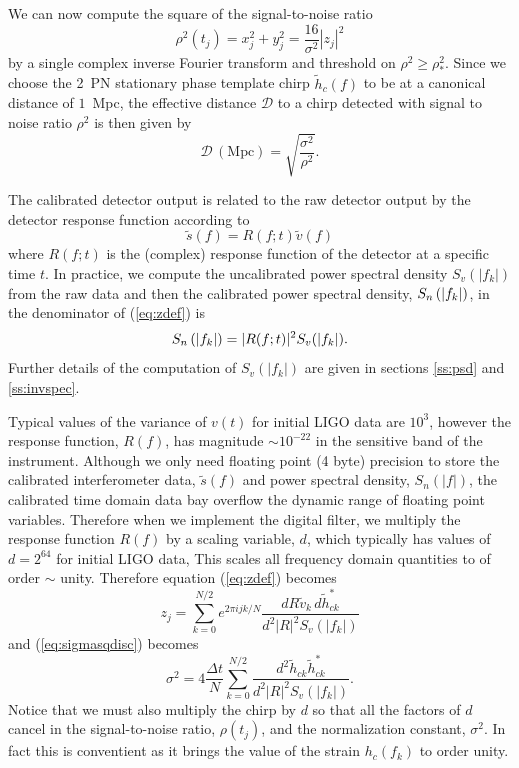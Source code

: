 We can now compute the square of the signal-to-noise ratio
\begin{equation}
\rho^2(t_j) = x_j^2 + y_j^2 = \frac{16}{\sigma^2}|z_j|^2
\end{equation}
by a single complex inverse Fourier transform and threshold on 
$\rho^2 \ge \rho^2_\ast$.  Since we choose the 2~PN stationary phase template
chirp $\tilde{h}_c(f)$ to be at a canonical distance of $1$~Mpc, the effective
distance $\mathcal{D}$ to a chirp detected with signal to noise ratio $\rho^2$
is then given by
\begin{equation}
\mathcal{D}\,(\mathrm{Mpc})= \sqrt{\frac{\sigma^2}{\rho^2}}.
\end{equation}

The calibrated detector output is related to the raw detector output by the
detector response function according to
\begin{equation}
\tilde{s}(f) = R(f;t) \tilde{v}(f)
\end{equation}
where $R(f;t)$ is the (complex) response function of the detector at a
specific time $t$\cite{calpaper}. In practice, we compute the uncalibrated
power spectral density $S_v(|f_k|)$ from the raw data and then the calibrated
power spectral density, $S_n\left(\left|f_{k}\right|\right)$, in the denominator of (\ref{eq:zdef}) is
\begin{equation}
S_n\left(\left|f_{k}\right|\right) = |R(f;t)|^2 S_v(|f_k|).
\end{equation}
Further details of the computation of $S_v(|f_k|)$ are given in sections
\ref{ss:psd} and \ref{ss:invspec}.

Typical values of the variance of $v(t)$ for initial LIGO data are $10^3$,
however the response function, $R(f)$, has magnitude $\sim 10^{-22}$ in the
sensitive band of the instrument. Although we only need floating point (4
byte) precision to store the calibrated interferometer data, $\tilde{s}(f)$
and power spectral density, $S_n(|f|)$, the calibrated time domain data bay
overflow the dynamic range of floating point variables. Therefore when we
implement the digital filter, we multiply the response function $R(f)$ by a
scaling variable, $d$, which typically has values of $d = 2^{64}$ for initial
LIGO data, This scales all frequency domain quantities to of order $\sim$ 
unity.  Therefore equation (\ref{eq:zdef}) becomes
\begin{equation}
\label{eq:zdefcal}
z_j = \sum_{k=0}^{N/2} e^{2\pi ijk/N} 
  \frac{dR\tilde{v}_k\, d\tilde{h}_{ck}^\ast}
  {d^2|R|^2S_v\left(\left|f_k\right|\right)}
\end{equation}
and (\ref{eq:sigmasqdisc}) becomes
\begin{equation}
\label{eq:sigmasqdisccal}
\sigma^2 = 4 \frac{\Delta t}{N} \sum_{k=0}^{N/2}
\frac{d^2 \tilde{h}_{ck}\tilde{h}_{ck}^\ast}
{d^2|R|^2S_v\left(\left|f_k\right|\right)}. 
\end{equation}
Notice that we must also multiply the chirp by $d$ so that all the factors of
$d$ cancel in the signal-to-noise ratio, $\rho(t_j)$, and the normalization
constant, $\sigma^2$. In fact this is conventient as it brings the value of
the strain $h_c(f_k)$ to order unity. 


